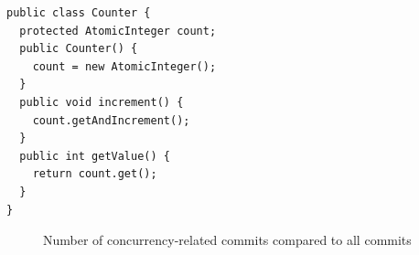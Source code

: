 \begin{lstlisting}
public class Counter {
  protected AtomicInteger count;
  public Counter() {
    count = new AtomicInteger();
  }
  public void increment() {
    count.getAndIncrement();
  }
  public int getValue() {
    return count.get();
  }
}
\end{lstlisting}
\begin{figure}
	\centering
	\caption{Number of concurrency-related commits compared to all commits}
	\label{fig:confidence}
\end{figure}

